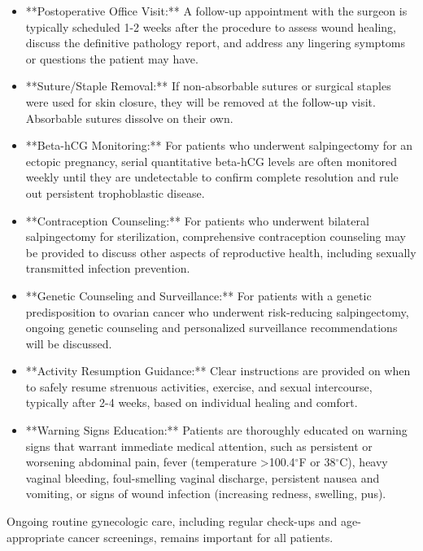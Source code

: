 \begin{itemize}
  \item **Postoperative Office Visit:** A follow-up appointment with the surgeon is typically scheduled 1-2 weeks after the procedure to assess wound healing, discuss the definitive pathology report, and address any lingering symptoms or questions the patient may have.
  \item **Suture/Staple Removal:** If non-absorbable sutures or surgical staples were used for skin closure, they will be removed at the follow-up visit. Absorbable sutures dissolve on their own.
  \item **Beta-hCG Monitoring:** For patients who underwent salpingectomy for an ectopic pregnancy, serial quantitative beta-hCG levels are often monitored weekly until they are undetectable to confirm complete resolution and rule out persistent trophoblastic disease.
  \item **Contraception Counseling:** For patients who underwent bilateral salpingectomy for sterilization, comprehensive contraception counseling may be provided to discuss other aspects of reproductive health, including sexually transmitted infection prevention.
  \item **Genetic Counseling and Surveillance:** For patients with a genetic predisposition to ovarian cancer who underwent risk-reducing salpingectomy, ongoing genetic counseling and personalized surveillance recommendations will be discussed.
  \item **Activity Resumption Guidance:** Clear instructions are provided on when to safely resume strenuous activities, exercise, and sexual intercourse, typically after 2-4 weeks, based on individual healing and comfort.
  \item **Warning Signs Education:** Patients are thoroughly educated on warning signs that warrant immediate medical attention, such as persistent or worsening abdominal pain, fever (temperature >100.4$^{\circ}$F or 38$^{\circ}$C), heavy vaginal bleeding, foul-smelling vaginal discharge, persistent nausea and vomiting, or signs of wound infection (increasing redness, swelling, pus).
\end{itemize}

Ongoing routine gynecologic care, including regular check-ups and age-appropriate cancer screenings, remains important for all patients.

